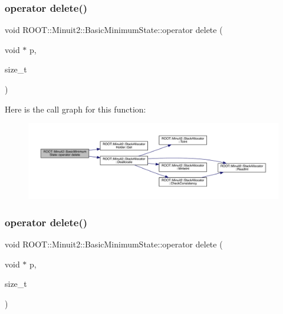 \subsubsection{\texorpdfstring{operator delete()}{operator delete()}\hspace{0.1cm}{\footnotesize\ttfamily [2/3]}}
{\footnotesize\ttfamily void R\+O\+O\+T\+::\+Minuit2\+::\+Basic\+Minimum\+State\+::operator delete (\begin{DoxyParamCaption}\item[{void $\ast$}]{p,  }\item[{size\+\_\+t}]{ }\end{DoxyParamCaption})\hspace{0.3cm}{\ttfamily [inline]}}

Here is the call graph for this function\+:
\nopagebreak
\begin{figure}[H]
\begin{center}
\leavevmode
\includegraphics[width=350pt]{d0/db1/classROOT_1_1Minuit2_1_1BasicMinimumState_a19ccca7f7825c16fca3c7ab6f147fdd6_cgraph}
\end{center}
\end{figure}
\mbox{\label{classROOT_1_1Minuit2_1_1BasicMinimumState_a19ccca7f7825c16fca3c7ab6f147fdd6}} 
\subsubsection{\texorpdfstring{operator delete()}{operator delete()}\hspace{0.1cm}{\footnotesize\ttfamily [3/3]}}
{\footnotesize\ttfamily void R\+O\+O\+T\+::\+Minuit2\+::\+Basic\+Minimum\+State\+::operator delete (\begin{DoxyParamCaption}\item[{void $\ast$}]{p,  }\item[{size\+\_\+t}]{ }\end{DoxyParamCaption})\hspace{0.3cm}{\ttfamily [inline]}}

